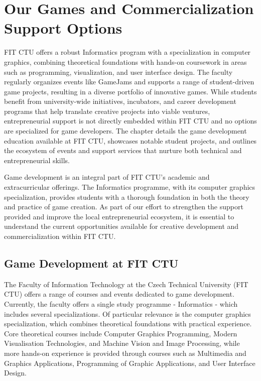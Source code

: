 \chapter{Our Games and Commercialization Support Options}

\begin{chapterabstract}	
    FIT CTU offers a robust Informatics program with a specialization in computer graphics, combining theoretical foundations with hands-on coursework in areas such as programming, visualization, and user interface design. The faculty regularly organizes events like GameJams and supports a range of student-driven game projects, resulting in a diverse portfolio of innovative games. While students benefit from university-wide initiatives, incubators, and career development programs that help translate creative projects into viable ventures, entrepreneurial support is not directly embedded within FIT CTU and no options are specialized for game developers. The chapter details the game development education available at FIT CTU, showcases notable student projects, and outlines the ecosystem of events and support services that nurture both technical and entrepreneurial skills.
\end{chapterabstract}

Game development is an integral part of FIT CTU’s academic and extracurricular offerings. The Informatics programme, with its computer graphics specialization, provides students with a thorough foundation in both the theory and practice of game creation. As part of our effort to strengthen the support provided and improve the local entrepreneurial ecosystem, it is essential to understand the current opportunities available for creative development and commercialization within FIT CTU.

\section{Game Development at FIT CTU}
The Faculty of Information Technology at the Czech Technical University (FIT CTU) offers a range of courses and events dedicated to game development. Currently, the faculty offers a single study programme - Informatics - which includes several specializations. Of particular relevance is the computer graphics specialization, which combines theoretical foundations with practical experience. Core theoretical courses include Computer Graphics Programming, Modern Visualisation Technologies, and Machine Vision and Image Processing, while more hands-on experience is provided through courses such as Multimedia and Graphics Applications, Programming of Graphic Applications, and User Interface Design.

